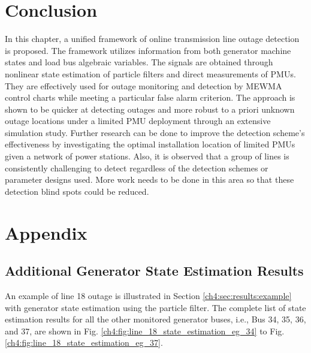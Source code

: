 \section{Conclusion}
\label{ch4:sec:conclusion}
In this chapter, a unified framework of online transmission line outage detection is proposed. The framework utilizes information from both generator machine states and load bus algebraic variables. The signals are obtained through nonlinear state estimation of particle filters and direct measurements of PMUs. They are effectively used for outage monitoring and detection by MEWMA control charts while meeting a particular false alarm criterion. The approach is shown to be quicker at detecting outages and more robust to a priori unknown outage locations under a limited PMU deployment through an extensive simulation study. Further research can be done to improve the detection scheme’s effectiveness by investigating the optimal installation location of limited PMUs given a network of power stations. Also, it is observed that a group of lines is consistently challenging to detect regardless of the detection schemes or parameter designs used. More work needs to be done in this area so that these detection blind spots could be reduced.









\section{Appendix} %
\label{ch4:sec:appendix}
\subsection{Additional Generator State Estimation Results}
\label{ch4:sec:appendix:state_estimation}

An example of line 18 outage is illustrated in Section \ref{ch4:sec:results:example} with generator state estimation using the particle filter. The complete list of state estimation results for all the other monitored generator buses, i.e., Bus 34, 35, 36, and 37, are shown in Fig. \ref{ch4:fig:line_18_state_estimation_eg_34} to Fig. \ref{ch4:fig:line_18_state_estimation_eg_37}.


